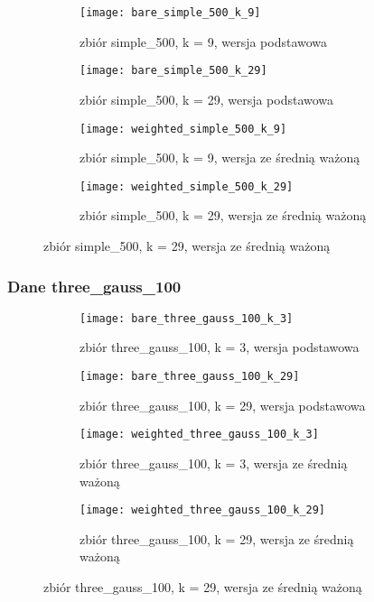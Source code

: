 \documentclass{scrartcl}
\begin{document}
\begin{figure}[H]
	\centering
	\begin{subfigure}[b]{0.4\linewidth}
		\texttt{[image: bare\_simple\_500\_k\_9]}
		\caption{zbiór simple\_500, k = 9, wersja podstawowa}
	\end{subfigure}
	\begin{subfigure}[b]{0.4\linewidth}
		\texttt{[image: bare\_simple\_500\_k\_29]}
		\caption{zbiór simple\_500, k = 29, wersja podstawowa}
	\end{subfigure}
	\begin{subfigure}[b]{0.4\linewidth}
		\texttt{[image: weighted\_simple\_500\_k\_9]}
		\caption{zbiór simple\_500, k = 9, wersja ze średnią ważoną}
	\end{subfigure}
	\begin{subfigure}[b]{0.4\linewidth}
		\texttt{[image: weighted\_simple\_500\_k\_29]}
		\caption{zbiór simple\_500, k = 29, wersja ze średnią ważoną}
	\end{subfigure}
\end{figure}

\subsubsection*{Dane three\_gauss\_100}

\begin{figure}[H]
	\centering
	\begin{subfigure}[b]{0.4\linewidth}
		\texttt{[image: bare\_three\_gauss\_100\_k\_3]}
		\caption{zbiór three\_gauss\_100, k = 3, wersja podstawowa}
	\end{subfigure}
	\begin{subfigure}[b]{0.4\linewidth}
		\texttt{[image: bare\_three\_gauss\_100\_k\_29]}
		\caption{zbiór three\_gauss\_100, k = 29, wersja podstawowa}
	\end{subfigure}
	\begin{subfigure}[b]{0.4\linewidth}
		\texttt{[image: weighted\_three\_gauss\_100\_k\_3]}
		\caption{zbiór three\_gauss\_100, k = 3, wersja ze średnią ważoną}
	\end{subfigure}
	\begin{subfigure}[b]{0.4\linewidth}
		\texttt{[image: weighted\_three\_gauss\_100\_k\_29]}
		\caption{zbiór three\_gauss\_100, k = 29, wersja ze średnią ważoną}
	\end{subfigure}
\end{figure}
\end{document}
